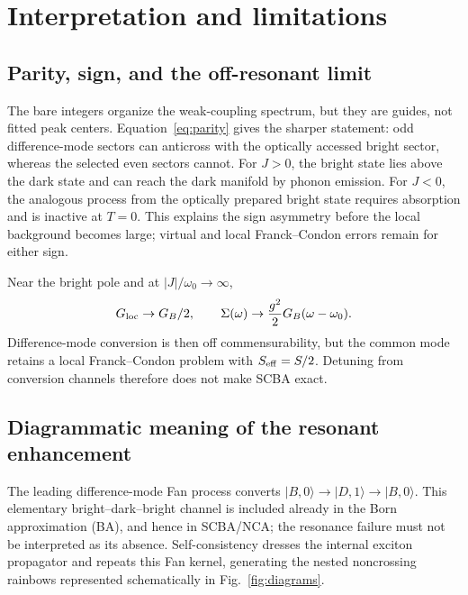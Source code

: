 \documentclass[11pt]{article}
\newcommand{\ket}[1]{\lvert #1\rangle}
\begin{document}
\clearpage
\section{Interpretation and limitations}

\subsection{Parity, sign, and the off-resonant limit}

The bare integers organize the weak-coupling spectrum, but they are guides,
not fitted peak centers.  Equation~\eqref{eq:parity} gives the sharper
statement: odd difference-mode sectors can anticross with the optically
accessed bright sector, whereas the selected even sectors cannot.  For
$J>0$, the bright state lies above the dark state and can reach the dark
manifold by phonon emission.  For $J<0$, the analogous process from the
optically prepared bright state requires absorption and is inactive at
$T=0$.  This explains the sign asymmetry before the local background becomes
large; virtual and local Franck--Condon errors remain for either sign.

Near the bright pole and at $|J|/\omega_0\rightarrow\infty$,
\begin{equation}
 G_{\rm loc}\rightarrow G_B/2,\qquad
 \Sigma(\omega)\rightarrow\frac{g^2}{2}G_B(\omega-\omega_0).
\end{equation}
Difference-mode conversion is then off commensurability, but the common mode
retains a local Franck--Condon problem with $S_{\rm eff}=S/2$.  Detuning from
conversion channels therefore does not make SCBA exact.

\subsection{Diagrammatic meaning of the resonant enhancement}

The leading difference-mode Fan process converts
$\ket{B,0}\rightarrow\ket{D,1}\rightarrow\ket{B,0}$.  This elementary
bright--dark--bright channel is included already in the Born approximation
(BA), and hence in SCBA/NCA; the resonance failure must not be interpreted as
its absence.  Self-consistency dresses the internal exciton propagator and
repeats this Fan kernel, generating the nested noncrossing rainbows represented
schematically in Fig.~\ref{fig:diagrams}.
\end{document}

